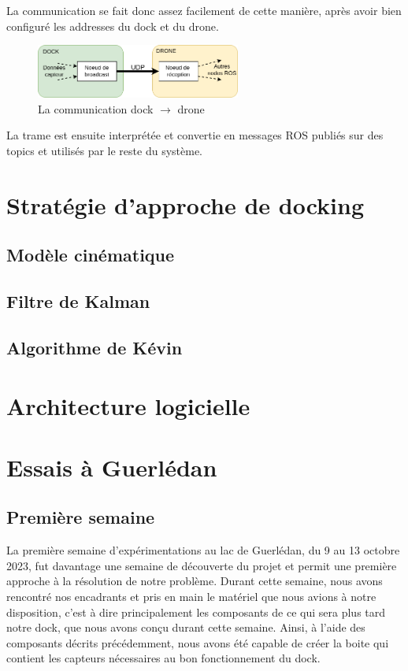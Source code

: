 \documentclass[12pt]{report}
\begin{document}
La communication se fait donc assez facilement de cette manière, après avoir bien configuré les addresses du dock et du drone.

\begin{figure}[H]
    \centering
    \includegraphics[width=0.6\textwidth]{imgs/UDP_connexion.png}
    \caption{La communication dock $\rightarrow$ drone}
\end{figure}

La trame est ensuite interprétée et convertie en messages ROS publiés sur des topics et utilisés par le reste du système.


\chapter{Stratégie d'approche de docking}

\section{Modèle cinématique}

\section{Filtre de Kalman}

\section{Algorithme de Kévin}

\chapter{Architecture logicielle}

\chapter{Essais à Guerlédan}

\section{Première semaine}

La première semaine d'expérimentations au lac de Guerlédan, du 9 au 13 octobre 2023, fut davantage une semaine de découverte du projet et permit une première approche à la résolution de notre problème. 
Durant cette semaine, nous avons rencontré nos encadrants et pris en main le matériel que nous avions à notre disposition, c'est à dire principalement les composants de ce qui sera plus tard notre dock,
que nous avons conçu durant cette semaine. Ainsi, à l'aide des composants décrits précédemment, nous avons été capable de créer la boite qui contient les capteurs nécessaires au bon fonctionnement du dock. 
\end{document}
